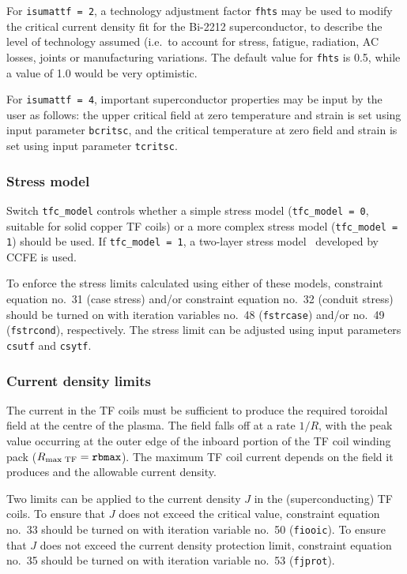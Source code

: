 \documentclass[11pt,a4paper]{report}
\begin{document}
For \texttt{isumattf = 2}, a technology adjustment factor \texttt{fhts} may be
used to modify the critical current density fit for the Bi-2212
superconductor, to describe the level of technology assumed (i.e.\ to account
for stress, fatigue, radiation, AC losses, joints or manufacturing variations.
The default value for \texttt{fhts} is 0.5, while a value of 1.0 would be very
optimistic.

For \texttt{isumattf = 4}, important superconductor properties may be input by
the user as follows: the upper critical field at zero temperature and strain
is set using input parameter \texttt{bcritsc}, and the critical temperature at
zero field and strain is set using input parameter \texttt{tcritsc}.

\subsubsection{Stress model}

Switch \texttt{tfc\_model} controls whether a simple stress model
(\texttt{tfc\_model = 0}, suitable for solid copper TF coils) or a more
complex stress model (\texttt{tfc\_model = 1}) should be used. If
\texttt{tfc\_model = 1}, a two-layer stress model~\cite{Morris_tfc} developed
by CCFE is used.

To enforce the stress limits calculated using either of these models,
constraint equation no.\ 31 (case stress) and/or constraint equation no.\ 32
(conduit stress) should be turned on with iteration variables no.\ 48
(\texttt{fstrcase}) and/or no.\ 49 (\texttt{fstrcond}), respectively. The
stress limit can be adjusted using input parameters \texttt{csutf} and
\texttt{csytf}.

\subsubsection{Current density limits}

The current in the TF coils must be sufficient to produce the required
toroidal field at the centre of the plasma. The field falls off at a rate
$1/R$, with the peak value occurring at the outer edge of the inboard portion
of the TF coil winding pack ($R_{\mbox{\scriptsize max TF}} =
\mathtt{rbmax}$). The maximum TF coil current depends on the field it produces
and the allowable current density.

Two limits can be applied to the current density $J$ in the (superconducting)
TF coils. To ensure that $J$ does not exceed the critical value, constraint
equation no.\ 33 should be turned on with iteration variable no.\ 50
(\texttt{fiooic}). To ensure that $J$ does not exceed the current density
protection limit, constraint equation no.\ 35 should be turned on with
iteration variable no.\ 53 (\texttt{fjprot}).
\end{document}
